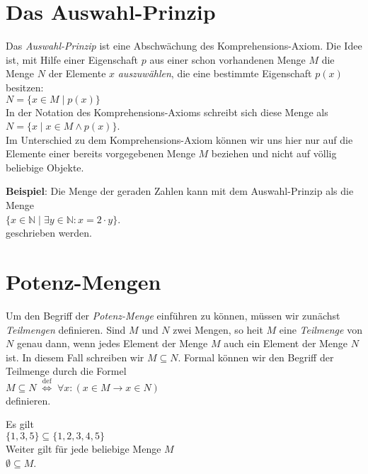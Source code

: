 \section{Das Auswahl-Prinzip}
Das \emph{Auswahl-Prinzip} ist eine Abschw\"{a}chung des Komprehensions-Axiom.  Die Idee
ist, mit Hilfe einer Eigenschaft $p$ aus einer schon vorhandenen Menge $M$ die Menge $N$ der 
Elemente $x$ \emph{auszuw\"{a}hlen}, die eine bestimmte Eigenschaft $p(x)$ besitzen: \\[0.2cm]
\hspace*{1.3cm} $N = \{ x\in M \;|\; p(x) \}$ \\[0.2cm]
In der Notation des Komprehensions-Axioms schreibt sich diese Menge als \\[0.2cm]
\hspace*{1.3cm} $N = \{ x \mid x \in M \wedge p(x) \}$. \\[0.2cm]
Im Unterschied zu dem Komprehensions-Axiom k\"{o}nnen wir uns hier nur auf die Elemente einer
bereits vorgegebenen Menge $M$ beziehen und nicht auf v\"{o}llig beliebige Objekte.
\vspace{0.2cm}

\noindent
\textbf{Beispiel}:
Die Menge der geraden Zahlen kann mit dem Auswahl-Prinzip als die Menge 
\\[0.2cm]
\hspace*{1.3cm}
 $\{ x \in \mathbb{N} \;|\; \exists y\in \mathbb{N}: x = 2 \cdot y \}$. 
\\[0.2cm]
geschrieben werden.

\section{Potenz-Mengen}
Um den Begriff der \emph{Potenz-Menge} einf\"{u}hren zu k\"{o}nnen, m\"{u}ssen wir zun\"{a}chst 
\emph{Teilmengen} definieren.  Sind $M$ und $N$ zwei Mengen, so hei\3t $M$ eine
\emph{Teilmenge} von $N$ genau dann, wenn jedes Element der Menge $M$ auch ein Element der
Menge $N$ ist.  In diesem Fall schreiben wir $M \subseteq N$.  Formal k\"{o}nnen wir den
Begriff der Teilmenge durch die Formel
 \\[0.2cm]
\hspace*{1.3cm}
$M \subseteq N \;\stackrel{\mathrm{def}}{\Longleftrightarrow}\; \forall x: (x \in M \rightarrow x \in N)$ 
 \\[0.2cm]
definieren.

\example
Es gilt 
\\[0.2cm]
\hspace*{1.3cm}
$\{ 1, 3, 5\} \subseteq \{ 1, 2, 3, 4, 5 \}$
\\[0.2cm]
Weiter gilt f\"{u}r jede beliebige Menge $M$
\\[0.2cm]
\hspace*{1.3cm}
$\emptyset \subseteq M$. \eox


